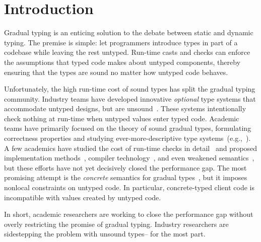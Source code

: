 \documentclass[english,cleveref,crc]{programming}
\begin{document}
\section{Introduction}
\label{s:intro}

Gradual typing is an enticing solution to
the debate between static and dynamic typing.
The premise is simple: let programmers introduce types in part of a
codebase while leaving the rest untyped.
Run-time casts and checks can enforce the assumptions that typed code makes about
untyped components, thereby ensuring that the types are sound no matter how
untyped code behaves.

Unfortunately, the high run-time cost of sound types has split
the gradual typing community.
Industry teams have developed innovative \emph{optional} type systems that accommodate
untyped designs, but are unsound~\cite{bat-ecoop-2014,rch-popl-2012,cvgrl-oopsla-2017,pep484}.
These systems intentionally check nothing at run-time when untyped values enter
typed code.
Academic teams have primarily focused on the theory of sound
gradual types, formulating correctness properties and studying ever-more-descriptive
type systems~(e.g.,~\cite{sgt-jfp-2016,clps-popl-2019,nla-popl-2019,mgt-oopsla-2021}).
A few academics have studied the cost of run-time checks
in detail~\cite{tfgnvf-popl-2016,gtnffvf-jfp-2019}
and proposed implementation methods~\cite{kas-pldi-2019,fgsfs-oopsla-2018},
compiler technology~\cite{vsc-dls-2019,bbst-oopsla-2017},
and even weakened semantics~\cite{glfd-pj-2022,vss-popl-2017,gi-scp-2020},
but these efforts have not yet decisively closed the performance gap.
The most promising attempt is the \emph{concrete\/} semantics
for gradual types~\cite{clzv-ecoop-2018,mt-oopsla-2017,wzlov-popl-2010}, but it imposes nonlocal
constraints on untyped code.
In particular, concrete-typed client code is incompatible with
values created by untyped code.

In short, academic researchers are working to close the performance gap
without overly restricting the promise of gradual typing.
Industry researchers are sidestepping the problem with unsound types\--- for the most part.
\end{document}

